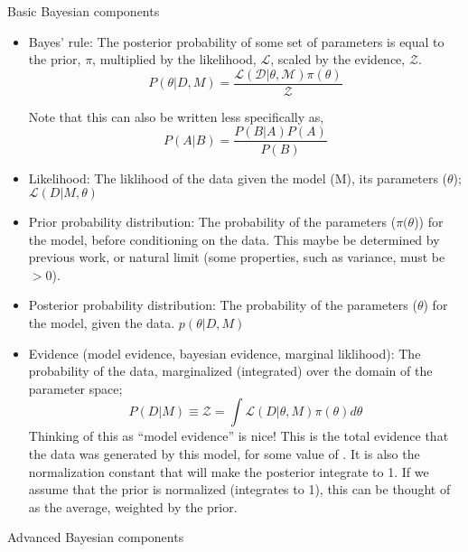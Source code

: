\documentclass{article}
\begin{document}
Basic Bayesian components
\begin{itemize}
    \item Bayes' rule: The posterior probability of some set of parameters is equal to the prior, $\pi$, multiplied by the likelihood, $\mathcal{L}$, scaled by the evidence, $\mathcal{Z}$.
        \begin{equation}
            P(\theta | D, M) = \frac{\mathcal{L(D | \theta, M)} \pi(\theta)}{\mathcal{Z}}
        \end{equation}

        Note that this can also be written less specifically as,
        \begin{equation}
            P(A | B) = \frac{P(B | A) P(A)}{P(B)}
        \end{equation}

    \item Likelihood: The liklihood of the data given the model (M), its parameters ($\theta$); $\mathcal{L}(D | M, \theta)$
    \item Prior probability distribution: The probability of the parameters ($\pi(\theta$)) for the model, before conditioning on the data. This maybe be determined by previous work, or natural limit (some properties, such as variance, must be $> 0$).
    \item Posterior probability distribution: The probability of the parameters ($\theta$) for the model, given the data. $p(\theta | D, M)$

    \item Evidence (model evidence, bayesian evidence, marginal liklihood): The probability of the data, marginalized (integrated) over the domain of the parameter space;
        \begin{equation}
            P(D | M) \equiv \mathcal{Z} = \int \mathcal{L}(D | \theta, M) \pi(\theta) d\theta
        \end{equation}
        Thinking of this as ``model evidence'' is nice! This is the total evidence that the data was generated by this model, for some value of \theta. It is also the normalization constant that will make the posterior integrate to 1.
        If we assume that the prior is normalized (integrates to 1), this can be thought of as the average, weighted by the prior.
\end{itemize}

Advanced Bayesian components
\end{document}
